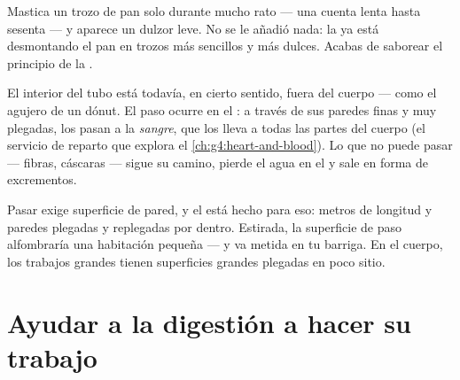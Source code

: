 \begin{example}\label{ex:g4:journey-of-food:sweet}
Mastica un trozo de pan solo durante mucho rato --- una cuenta lenta
hasta sesenta --- y aparece un dulzor leve. No se le añadió nada: la
 ya está desmontando el pan en trozos más sencillos y más
dulces. Acabas de saborear el principio de la .
\end{example}

\begin{proposition}\label{prop:g4:journey-of-food:absorb}
El interior del tubo está todavía, en cierto sentido, fuera del cuerpo
--- como el agujero de un dónut. El paso ocurre en el \emph{}: a través de sus paredes finas y muy plegadas, los 
pasan a la \emph{sangre}, que los lleva a todas las
partes del cuerpo (el servicio de reparto que explora el
\cref{ch:g4:heart-and-blood}). Lo que no puede pasar --- fibras,
cáscaras --- sigue su camino, pierde el agua en el  y
sale en forma de excrementos.
\end{proposition}
\admitted

\begin{remark}\label{rem:g4:journey-of-food:surface}
Pasar exige superficie de pared, y el  está hecho
para eso: metros de longitud y paredes plegadas y replegadas por
dentro. Estirada, la superficie de paso alfombraría una habitación
pequeña --- y va metida en tu barriga. En el cuerpo, los trabajos
grandes tienen superficies grandes plegadas en poco sitio.
\end{remark}

\section{Ayudar a la digestión a hacer su trabajo}

